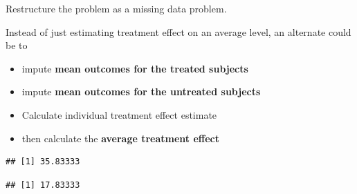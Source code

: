 \documentclass[
]{book}
\newenvironment{Shaded}{\begin{snugshade}}{\end{snugshade}}
\newcommand{\FunctionTok}[1]{\textcolor[rgb]{0.00,0.00,0.00}{#1}}
\newcommand{\NormalTok}[1]{#1}
\newcommand{\OtherTok}[1]{\textcolor[rgb]{0.56,0.35,0.01}{#1}}
\newcommand{\SpecialCharTok}[1]{\textcolor[rgb]{0.00,0.00,0.00}{#1}}
\providecommand{\tightlist}{%
  \setlength{\itemsep}{0pt}\setlength{\parskip}{0pt}}
\begin{document}
\begin{rmdcomment}
Restructure the problem as a missing data problem.
\end{rmdcomment}

Instead of just estimating treatment effect on an average level, an alternate could be to

\begin{itemize}
\tightlist
\item
  impute \textbf{mean outcomes for the treated subjects}
\item
  impute \textbf{mean outcomes for the untreated subjects}
\item
  Calculate individual treatment effect estimate
\item
  then calculate the \textbf{average treatment effect}
\end{itemize}

\begin{Shaded}
\end{Shaded}

\begin{verbatim}
## [1] 35.83333
\end{verbatim}

\begin{Shaded}
\end{Shaded}

\begin{verbatim}
## [1] 17.83333
\end{verbatim}
\end{document}
